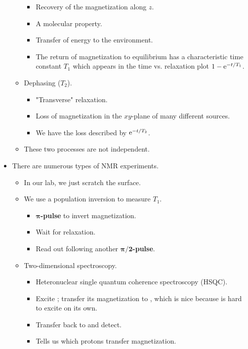 \documentclass[../notes.tex]{subfiles}
\begin{document}
\begin{itemize}
\begin{itemize}
\begin{itemize}
            \item Recovery of the magnetization along $z$.
            \item A molecular property.
            \item Transfer of energy to the environment.
            \item The return of magnetization to equilibrium has a characteristic time constant $T_1$ which appears in the time vs. relaxation plot $1-\e[-t/T_1]$.
        \end{itemize}
        \item Dephasing ($T_2$).
        \begin{itemize}
            \item "Transverse" relaxation.
            \item Loss of magnetization in the $xy$-plane of many different sources.
            \item We have the loss described by $\e[-t/T_2]$.
        \end{itemize}
        \item These two processes are not independent.
    \end{itemize}
    \item There are numerous types of NMR experiments.
    \begin{itemize}
        \item In our lab, we just scratch the surface.
        \item We use a population inversion to measure $T_1$.
        \begin{itemize}
            \item \textbf{$\bm{\pi}$-pulse} to invert magnetization.
            \item Wait for relaxation.
            \item Read out following another \textbf{$\bm{\pi/2}$-pulse}.
        \end{itemize}
        \item Two-dimensional spectroscopy.
        \begin{itemize}
            \item Heteronuclear single quantum coherence spectroscopy (HSQC).
            \item Excite ; transfer its magnetization to , which is nice because  is hard to excite on its own.
            \item Transfer back to  and detect.
            \item Tells us which protons transfer magnetization.
        \end{itemize}
    \end{itemize}
\end{itemize}
\end{document}
